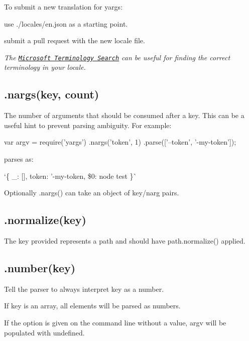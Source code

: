 To submit a new translation for yargs\+:


\begin{DoxyEnumerate}
\item use {\ttfamily ./locales/en.json} as a starting point.
\item submit a pull request with the new locale file.
\end{DoxyEnumerate}

{\itshape The \href{http://www.microsoft.com/Language/en-US/Search.aspx}{\tt Microsoft Terminology Search} can be useful for finding the correct terminology in your locale.}

\subsection*{\label{_nargs}%
.nargs(key, count) }

The number of arguments that should be consumed after a key. This can be a useful hint to prevent parsing ambiguity. For example\+:


\begin{DoxyCode}
var argv = require('yargs')
  .nargs('token', 1)
  .parse(['--token', '-my-token']);
\end{DoxyCode}


parses as\+:

`\{ \+\_\+\+: \mbox{[}\mbox{]}, token\+: '-\/my-\/token\textquotesingle{}, \textquotesingle{}\$0\textquotesingle{}\+: \textquotesingle{}node test\textquotesingle{} \}\`{}

Optionally {\ttfamily .nargs()} can take an object of {\ttfamily key}/{\ttfamily narg} pairs.

\subsection*{\label{_normalize}%
.normalize(key) }

The key provided represents a path and should have {\ttfamily path.\+normalize()} applied.

\subsection*{\label{_number}%
.number(key) }

Tell the parser to always interpret {\ttfamily key} as a number.

If {\ttfamily key} is an array, all elements will be parsed as numbers.

If the option is given on the command line without a value, {\ttfamily argv} will be populated with {\ttfamily undefined}.

